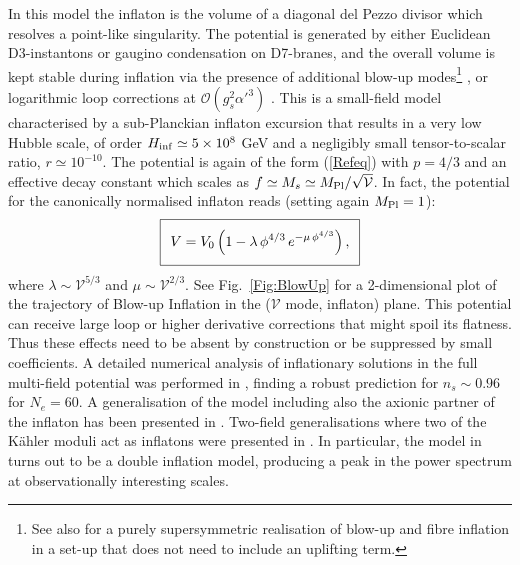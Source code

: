 In this model the inflaton is the volume of a diagonal del Pezzo divisor which resolves a point-like singularity. The potential is generated by either Euclidean D3-instantons or gaugino condensation on D7-branes, and the overall volume is kept stable during inflation via the presence of additional blow-up modes\footnote{See also \cite{Krippendorf:2009zza} for a purely supersymmetric realisation of blow-up and fibre inflation in a set-up that does not need to  include an uplifting term. } \cite{Conlon:2005jm}, or logarithmic loop corrections at $\mathcal{O}(g_s^2 \alpha'^3)$ \cite{Antoniadis:2019rkh}. This is a small-field model characterised by a sub-Planckian inflaton excursion that results in a very low Hubble scale, of order $H_{\rm inf}\simeq 5\times 10^8$ GeV and a negligibly small tensor-to-scalar ratio, $r\simeq 10^{-10}$. The potential is again of the form (\ref{Refeq}) with $p=4/3$ and an effective decay constant which scales as $f \simeq M_s \simeq M_{\rm Pl}/\sqrt{\mathcal{V}}$. In fact, the potential for the canonically normalised inflaton reads (setting again $M_{\rm Pl}=1$):
\begin{equation}
\setlength\fboxsep{0.25cm}
\setlength\fboxrule{0.4pt}
\boxed{
V = V_0\left(1-\lambda \,\phi^{4/3} \,e^{-\mu\,\phi^{4/3}}\right),
}
\end{equation}
where $\lambda\sim \mathcal{V}^{5/3}$ and $\mu\sim \mathcal{V}^{2/3}$. See Fig.~\ref{Fig:BlowUp} for a 2-dimensional plot of the trajectory of Blow-up Inflation in the ($\mathcal{V}$ mode, inflaton) plane. This potential can receive large loop or higher derivative corrections that might spoil its flatness. Thus these effects need to be absent by construction or be suppressed by small coefficients. A detailed numerical analysis of inflationary solutions in the full multi-field potential was performed in \cite{Blanco-Pillado:2009dmu}, finding a robust prediction for $n_s\sim 0.96$ for $N_e=60$. A generalisation of the model including also the axionic partner of the inflaton has been presented in \cite{Bond:2006nc}. Two-field generalisations where two of the K\"ahler moduli act as inflatons were presented in \cite{Yang:2008ns,Berglund:2009uf,Kawasaki:2010ux}. In particular, the model in \cite{Kawasaki:2010ux} turns out to be a double inflation model, producing a peak in the power spectrum at observationally interesting scales.


